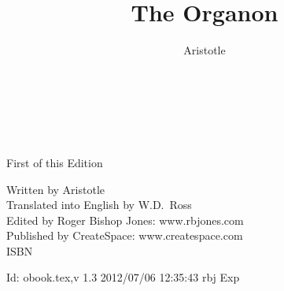 \title{The Organon}
\author{Aristotle}
\date{\ }





\renewcommand{\thechapter}{Volume \arabic{chapter}}
\renewcommand{\thesection}{Book \Roman{section}}
\renewcommand{\thesubsection}{Part \arabic{subsection}}

\addtolength{\cftchapnumwidth}{4em}
\addtolength{\cftsecnumwidth}{2.5em}
\addtolength{\cftsubsecnumwidth}{0.5em}

\frontmatter

\begin{titlepage}
\maketitle

\ 
\\

\vfill

\begin{centering}


{\Large First of this Edition}

\vfill



Written by Aristotle\\

Translated into English by W.D.~Ross\\

Edited by Roger Bishop Jones: www.rbjones.com\\

Published by CreateSpace: www.createspace.com\\

ISBN

\vfill

{\footnotesize




$ $Id: obook.tex,v 1.3 2012/07/06 12:35:43 rbj Exp $ $


}%

\end{centering}


\thispagestyle{empty}
\end{titlepage}


